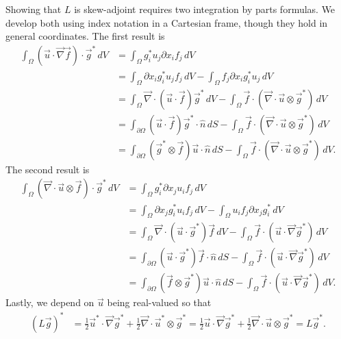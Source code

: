 \documentclass[letterpaper,reqno,11pt]{amsart}
\newcommand{\vecnabla}{\ensuremath{\vec{\nabla}}}
\begin{document}
Showing that $L$ is skew-adjoint requires two integration by parts formulas.
We develop both using index notation in a Cartesian frame, though they hold in
general coordinates.  The first result is
\begin{align}
  \int_{\Omega}
    \left(\vec{u}\cdot\vecnabla\vec{f}\right)\cdot{}\vec{g}^{\ast}
    \,d\!V
  &=
  \int_{\Omega} g_i^{\ast} u_j \partial\!x_{i} f_j \,d\!V
  \\
  &=
    \int_{\Omega} \partial\!x_{i} g_i^{\ast} u_j f_j \,d\!V
  - \int_{\Omega} f_j \partial\!x_{i} g_i^{\ast} u_j \,d\!V
  \\
  &=
    \int_{\Omega}
      \vecnabla\cdot\left(\vec{u}\cdot\vec{f}\right)\vec{g}^{\ast}
      \,d\!V
  - \int_{\Omega}
      \vec{f}\cdot\left(\vecnabla\cdot\vec{u}\otimes\vec{g}^{\ast}\right)
      \,d\!V
  \\
  &=
    \int_{\partial\Omega}
      \left(\vec{u}\cdot\vec{f}\right)\vec{g}^{\ast}\cdot\hat{n}
      \,d\!S
  - \int_{\Omega}
      \vec{f}\cdot\left(\vecnabla\cdot\vec{u}\otimes\vec{g}^{\ast}\right)
      \,d\!V
  \\
  &=
    \int_{\partial\Omega}
      \left(\vec{g}^{\ast}\otimes\vec{f}\right)\vec{u}\cdot\hat{n}
      \,d\!S
  - \int_{\Omega}
      \vec{f}\cdot\left(\vecnabla\cdot\vec{u}\otimes\vec{g}^{\ast}\right)
      \,d\!V
  .
\end{align}
The second result is
\begin{align}
  \int_{\Omega}
    \left(\vecnabla\cdot\vec{u}\otimes\vec{f}\right)\cdot\vec{g}^{\ast}
    \,d\!V
  &=
  \int_{\Omega} g_i^{\ast} \partial\!x_{j} u_i f_j \,d\!V
  \\
  &=
    \int_{\Omega} \partial\!x_{j} g_i^{\ast} u_i f_j \,d\!V
  - \int_{\Omega} u_i f_j \partial\!x_{j} g_i^{\ast} \,d\!V
  \\
  &=
    \int_{\Omega}
      \vecnabla\cdot\left(\vec{u}\cdot\vec{g}^{\ast}\right)\vec{f}
      \,d\!V
  - \int_{\Omega}
      \vec{f}\cdot\left(\vec{u}\cdot\vecnabla\vec{g}^{\ast}\right)
      \,d\!V
  \\
  &=
    \int_{\partial\Omega}
      \left(\vec{u}\cdot\vec{g}^{\ast}\right)\vec{f}\cdot\hat{n}
      \,d\!S
  - \int_{\Omega}
      \vec{f}\cdot\left(\vec{u}\cdot\vecnabla\vec{g}^{\ast}\right)
      \,d\!V
  \\
  &=
    \int_{\partial\Omega}
      \left(\vec{f}\otimes\vec{g}^{\ast}\right)\vec{u}\cdot\hat{n}
      \,d\!S
  - \int_{\Omega}
      \vec{f}\cdot\left(\vec{u}\cdot\vecnabla\vec{g}^{\ast}\right)
      \,d\!V
  .
\end{align}
Lastly, we depend on $\vec{u}$ being real-valued so that
\begin{align}
  \left(L\vec{g}\right)^{\ast}
  &=
      \frac{1}{2}\vec{u}^{\ast}\cdot\vecnabla{}\vec{g}^{\ast}
    + \frac{1}{2}\vecnabla\cdot\vec{u}^{\ast}\otimes\vec{g}^{\ast}
  =
      \frac{1}{2}\vec{u}\cdot\vecnabla{}\vec{g}^{\ast}
    + \frac{1}{2}\vecnabla\cdot\vec{u}\otimes\vec{g}^{\ast}
  = L\vec{g}^{\ast}
  .
\end{align}
\end{document}

